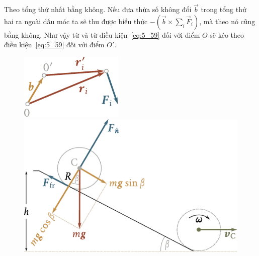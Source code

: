 \noindent
Theo  tổng thứ nhất bằng không. Nếu đưa thừa số không đổi $\vec{b}$ trong tổng thứ hai ra ngoài dấu móc ta sẽ thu được biểu thức $-\left(\vec{b}\times\sum_i\vec{F}_i\right)$, mà theo  nó cũng bằng không. Như vậy từ  và từ điều kiện~\eqref{eq:5_59} đối với điểm $O$ sẽ kéo theo điều kiện~\eqref{eq:5_59} đối với điểm $O'$.

\begin{figure}[!htb]
	\begin{minipage}[t]{0.27\linewidth}
		\begin{center}
			\includegraphics[scale=1]{figures/ch_05/fig_5_21.pdf}
			\caption[]{}
			\label{fig:5_21}
		\end{center}
	\end{minipage}
	\hspace{-0.05cm}
	\begin{minipage}[t]{0.7\linewidth}
		\begin{center}
			\includegraphics[scale=1]{figures/ch_05/fig_5_22.pdf}
			\caption[]{}
			\label{fig:5_22}
		\end{center}
	\end{minipage}
\end{figure}

